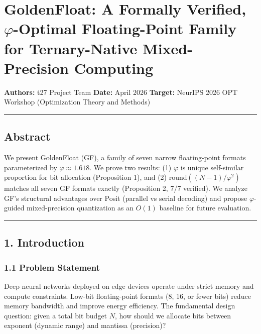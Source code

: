 \section{\texorpdfstring{GoldenFloat: A Formally Verified,
\(\varphi\)-Optimal Floating-Point Family for Ternary-Native
Mixed-Precision
Computing}{GoldenFloat: A Formally Verified, \textbackslash varphi-Optimal Floating-Point Family for Ternary-Native Mixed-Precision Computing}}\label{goldenfloat-a-formally-verified-varphi-optimal-floating-point-family-for-ternary-native-mixed-precision-computing}

\textbf{Authors:} t27 Project Team \textbf{Date:} April 2026
\textbf{Target:} NeurIPS 2026 OPT Workshop (Optimization Theory and
Methods)

\begin{center}\rule{0.5\linewidth}{0.5pt}\end{center}

\subsection{Abstract}\label{abstract}

We present GoldenFloat (GF), a family of seven narrow floating-point
formats parameterized by \(\varphi \approx 1.618\). We prove two
results: (1) \(\varphi\) is unique self-similar proportion for bit
allocation (Proposition 1), and (2) \(\text{round}((N-1)/\varphi^2)\)
matches all seven GF formats exactly (Proposition 2, 7/7 verified). We
analyze GF's structural advantages over Posit (parallel vs serial
decoding) and propose \(\varphi\)-guided mixed-precision quantization as
an \(O(1)\) baseline for future evaluation.

\begin{center}\rule{0.5\linewidth}{0.5pt}\end{center}

\subsection{1. Introduction}\label{introduction}

\subsubsection{1.1 Problem Statement}\label{problem-statement}

Deep neural networks deployed on edge devices operate under strict
memory and compute constraints. Low-bit floating-point formats (8, 16,
or fewer bits) reduce memory bandwidth and improve energy efficiency.
The fundamental design question: given a total bit budget \(N\), how
should we allocate bits between exponent (dynamic range) and mantissa
(precision)?

